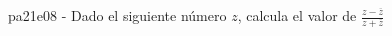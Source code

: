 \documentclass[spanish, 11pt]{exam}
\begin{document}
\begin{questions}
\begin{multicols}{1}
\begin{parts}
        \end{parts}
        \end{multicols}
        \question pa21e08 - Dado el siguiente número $z$, calcula el valor de $\frac{z-\overline{z}}{z+\overline{z}}$
        \begin{multicols}{2} 
        \end{multicols}
        
    \end{questions}
    
\end{document}
